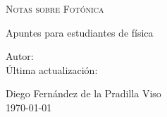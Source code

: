 \begin{center}
    \vspace*{2cm}
    \fontsize{20.74}{10}\selectfont
    \textsc{
        Notas sobre Fotónica
    }

    \hrulefill
    
    \vspace{10pt}
    {\fontsize{14.4}{15}\selectfont
    Apuntes para estudiantes de física}
    
\end{center}
\vspace{1cm}
\begin{minipage}[t]{0.37\textwidth}
    \begin{flushright}
        Autor: \\[5pt]
        Última actualización:
    \end{flushright}
\end{minipage}
\hspace{0.5cm}
\begin{minipage}[t]{0.45\textwidth}
    \begin{flushleft}
        Diego Fernández de la Pradilla Viso \\[3pt]
        \today
    \end{flushleft}
\end{minipage}

\vspace{3cm}
\begingroup
\hypersetup{hidelinks} 
\tableofcontents
\endgroup